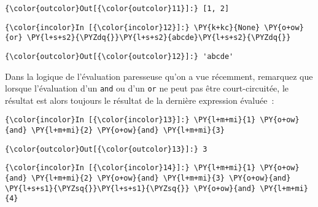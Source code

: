 \begin{Verbatim}[commandchars=\\\{\},frame=single,framerule=0.3mm,rulecolor=\color{cellframecolor}]
{\color{outcolor}Out[{\color{outcolor}11}]:} [1, 2]
\end{Verbatim}
            
    \begin{Verbatim}[commandchars=\\\{\},frame=single,framerule=0.3mm,rulecolor=\color{cellframecolor}]
{\color{incolor}In [{\color{incolor}12}]:} \PY{k+kc}{None} \PY{o+ow}{or} \PY{l+s+s2}{\PYZdq{}}\PY{l+s+s2}{abcde}\PY{l+s+s2}{\PYZdq{}}
\end{Verbatim}


\begin{Verbatim}[commandchars=\\\{\},frame=single,framerule=0.3mm,rulecolor=\color{cellframecolor}]
{\color{outcolor}Out[{\color{outcolor}12}]:} 'abcde'
\end{Verbatim}
            
    Dans la logique de l'évaluation paresseuse qu'on a vue récemment,
remarquez que lorsque l'évaluation d'un \texttt{and} ou d'un \texttt{or}
ne peut pas être court-circuitée, le résultat est alors toujours le
résultat de la dernière expression évaluée~:

    \begin{Verbatim}[commandchars=\\\{\},frame=single,framerule=0.3mm,rulecolor=\color{cellframecolor}]
{\color{incolor}In [{\color{incolor}13}]:} \PY{l+m+mi}{1} \PY{o+ow}{and} \PY{l+m+mi}{2} \PY{o+ow}{and} \PY{l+m+mi}{3}
\end{Verbatim}


\begin{Verbatim}[commandchars=\\\{\},frame=single,framerule=0.3mm,rulecolor=\color{cellframecolor}]
{\color{outcolor}Out[{\color{outcolor}13}]:} 3
\end{Verbatim}
            
    \begin{Verbatim}[commandchars=\\\{\},frame=single,framerule=0.3mm,rulecolor=\color{cellframecolor}]
{\color{incolor}In [{\color{incolor}14}]:} \PY{l+m+mi}{1} \PY{o+ow}{and} \PY{l+m+mi}{2} \PY{o+ow}{and} \PY{l+m+mi}{3} \PY{o+ow}{and} \PY{l+s+s1}{\PYZsq{}}\PY{l+s+s1}{\PYZsq{}} \PY{o+ow}{and} \PY{l+m+mi}{4}
\end{Verbatim}


